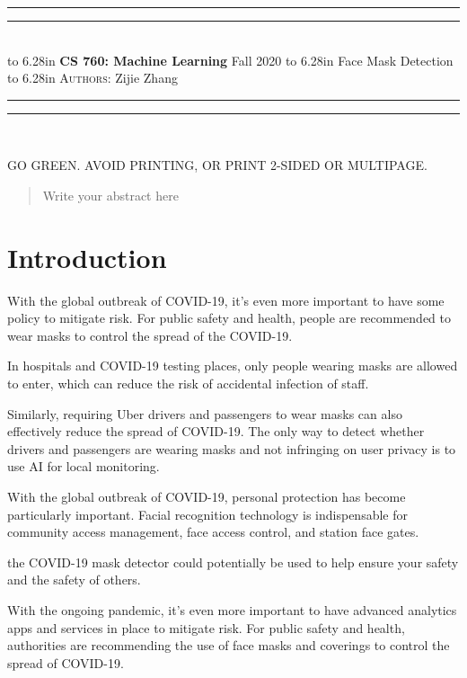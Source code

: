 \documentclass{article}
\newcommand{\lecture}[2]{
\pagestyle{myheadings}
\thispagestyle{plain}
\newpage
\noindent
\begin{center}
\rule{\textwidth}{1.6pt}\vspace*{-\baselineskip}\vspace*{2pt} %
\rule{\textwidth}{0.4pt}\\[1\baselineskip] %
\vbox{\vspace{2mm}
\hbox to 6.28in { {\bf CS 760: Machine Learning} \hfill Fall 2020 }
\vspace{4mm}
\hbox to 6.28in { {\Large \hfill #1  \hfill} }
\vspace{4mm}
\hbox to 6.28in { {\scshape Authors:}  #2 \hfill }}
\vspace{-2mm}
\rule{\textwidth}{0.4pt}\vspace*{-\baselineskip}\vspace{3.2pt} %
\rule{\textwidth}{1.6pt}\\[\baselineskip] %
\end{center}
\vspace*{4mm}
}
\begin{document}
\lecture{Face Mask Detection}{Zijie Zhang}

\begin{center}
{\Large {\sf GO GREEN. AVOID PRINTING, OR PRINT 2-SIDED OR MULTIPAGE.}}
\end{center}

\begin{abstract}
Write your abstract here
\end{abstract}

\section{Introduction}
With the global outbreak of COVID-19, it's even more important to have some policy to mitigate risk. For public safety and health, people are recommended to wear masks to control the spread of the COVID-19.

In hospitals and COVID-19 testing places, only people wearing masks are allowed to enter, which can reduce the risk of accidental infection of staff.

Similarly, requiring Uber drivers and passengers to wear masks can also effectively reduce the spread of COVID-19. The only way to detect whether drivers and passengers are wearing masks and not infringing on user privacy is to use AI for local monitoring.

With the global outbreak of COVID-19, personal protection has become particularly important. Facial recognition technology is indispensable for community access management, face access control, and station face gates.

the COVID-19 mask detector could potentially be used to help ensure your safety and the safety of others.

With the ongoing pandemic, it’s even more important to have advanced analytics apps and services in place to mitigate risk. For public safety and health, authorities are recommending the use of face masks and coverings to control the spread of COVID-19.
\end{document}
